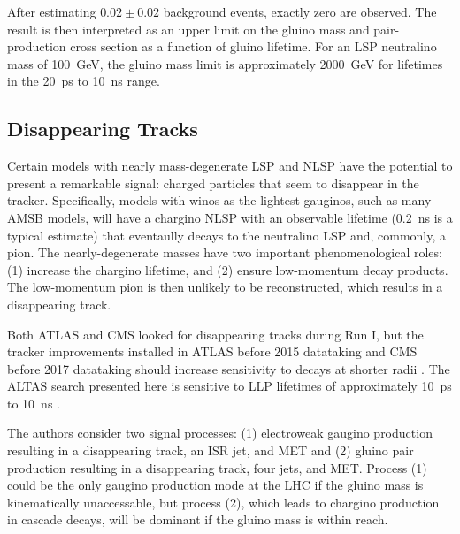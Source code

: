 \documentclass[12pt]{article}
\begin{document}
    After estimating $\num{0.02} \pm \num{0.02}$ background events, exactly zero are observed. The result is then interpreted as an upper limit on the gluino mass and pair-production cross section as a function of gluino lifetime. For an LSP neutralino mass of \SI{100}{\giga\electronvolt}, the gluino mass limit is approximately \SI{2000}{\giga\electronvolt} for lifetimes in the \SI{20}{\pico\s} to \SI{10}{\nano\s} range. 

\subsection{Disappearing Tracks}
    Certain models with nearly mass-degenerate LSP and NLSP have the potential to present a remarkable signal: charged particles that seem to disappear in the tracker. Specifically, models with winos as the lightest gauginos, such as many AMSB models, will have a chargino NLSP with an observable lifetime (\SI{0.2}{\nano\s} is a typical estimate) that eventaully decays to the neutralino LSP and, commonly, a pion. The nearly-degenerate masses have two important phenomenological roles: (1) increase the chargino lifetime, and (2) ensure low-momentum decay products. The low-momentum pion is then unlikely to be reconstructed, which results in a disappearing track.

    Both ATLAS and CMS looked for disappearing tracks during Run I, but the tracker improvements installed in ATLAS before 2015 datataking and CMS before 2017 datataking should increase sensitivity to decays at shorter radii . The ALTAS search presented here is sensitive to LLP lifetimes of approximately \SI{10}{\pico\s} to \SI{10}{\nano\s} .

    The authors consider two signal processes: (1) electroweak gaugino production resulting in a disappearing track, an ISR jet, and MET and (2) gluino pair production resulting in a disappearing track, four jets, and MET. Process (1) could be the only gaugino production mode at the LHC if the gluino mass is kinematically unaccessable, but process (2), which leads to chargino production in cascade decays, will be dominant if the gluino mass is within reach.
\end{document}
